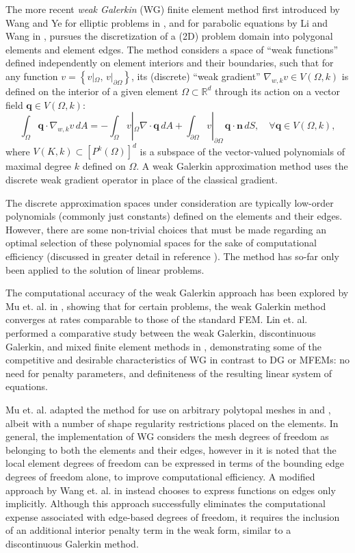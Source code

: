 		The more recent \textit{weak Galerkin} (WG) finite element method first introduced by Wang and Ye for elliptic problems in \cite{Wang:13}, and for parabolic equations by Li and Wang in \cite{Li:13}, pursues the discretization of a (2D) problem domain into polygonal elements and element edges. The method considers a space of ``weak functions'' defined independently on element interiors and their boundaries, such that for any function $v = \left\{ v|_\Omega, \, v|_{\partial \Omega} \right\}$, its (discrete) ``weak gradient'' $\nabla_{w,k} v \in V(\Omega,k)$ is defined on the interior of a given element $\Omega \subset \mathbb{R}^d$ through its action on a vector field $\mathbf{q} \in V(\Omega,k)$:
\begin{equation}
	\int_\Omega \mathbf{q} \cdot \nabla_{w,k} v \, dA = - \int_\Omega v|_\Omega \nabla \cdot \mathbf{q} \, dA + \int_{\partial \Omega} v|_{\partial \Omega} \, \mathbf{q} \cdot \mathbf{n} \, dS, \quad \forall \mathbf{q} \in V(\Omega,k),
\end{equation}
where $V(K,k) \subset \left[ P^k (\Omega) \right]^d$ is a subspace of the vector-valued polynomials of maximal degree $k$ defined on $\Omega$. A weak Galerkin approximation method uses the discrete weak gradient operator in place of the classical gradient.

	The discrete approximation spaces under consideration are typically low-order polynomials (commonly just constants) defined on the elements and their edges. However, there are some non-trivial choices that must be made regarding an optimal selection of these polynomial spaces for the sake of computational efficiency (discussed in greater detail in reference \cite{Mu:15:1}). The method has so-far only been applied to the solution of linear problems.

	The computational accuracy of the weak Galerkin approach has been explored by Mu et. al. in \cite{Mu:13}, showing that for certain problems, the weak Galerkin method converges at rates comparable to those of the standard FEM. Lin et. al. performed a comparative study between the weak Galerkin, discontinuous Galerkin, and mixed finite element methods in \cite{Lin:15}, demonstrating some of the competitive and desirable characteristics of WG in contrast to DG or MFEMs: no need for penalty parameters, and definiteness of the resulting linear system of equations.

	Mu et. al. adapted the method for use on arbitrary polytopal meshes in \cite{Mu:15:2} and \cite{Mu:15:1}, albeit with a number of shape regularity restrictions placed on the elements. In general, the implementation of WG considers the mesh degrees of freedom as belonging to both the elements and their edges, however in \cite{Mu:15:1} it is noted that the local element degrees of freedom can be expressed in terms of the bounding edge degrees of freedom alone, to improve computational efficiency. A modified approach by Wang et. al. in \cite{Wang:14} instead chooses to express functions on edges only implicitly. Although this approach successfully eliminates the computational expense associated with edge-based degrees of freedom, it requires the inclusion of an additional interior penalty term in the weak form, similar to a discontinuous Galerkin method.


